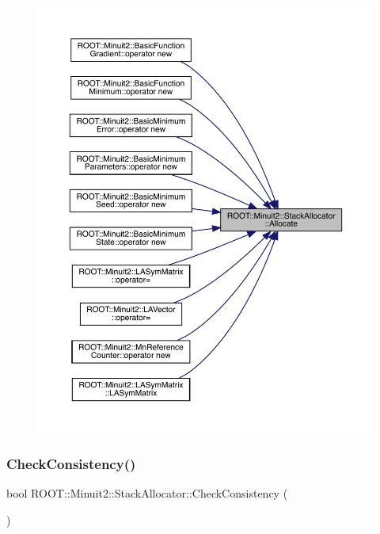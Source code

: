 \begin{figure}[H]
\begin{center}
\leavevmode
\includegraphics[width=350pt]{d3/d1e/classROOT_1_1Minuit2_1_1StackAllocator_a1fb4d1744055446776080af229679e03_icgraph}
\end{center}
\end{figure}
\mbox{\label{classROOT_1_1Minuit2_1_1StackAllocator_ad1189cdc76a07c36ef1924ad2488797d}} 
\subsubsection{\texorpdfstring{CheckConsistency()}{CheckConsistency()}\hspace{0.1cm}{\footnotesize\ttfamily [1/2]}}
{\footnotesize\ttfamily bool R\+O\+O\+T\+::\+Minuit2\+::\+Stack\+Allocator\+::\+Check\+Consistency (\begin{DoxyParamCaption}{ }\end{DoxyParamCaption})\hspace{0.3cm}{\ttfamily [inline]}}

